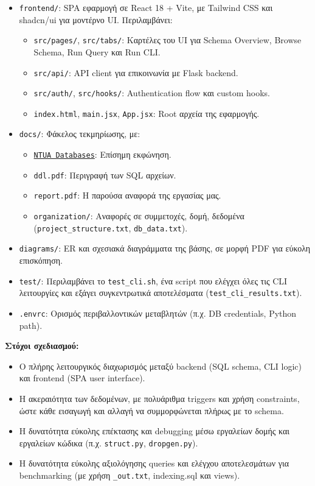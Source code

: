\documentclass[13pt]{extarticle}
\begin{document}
\begin{itemize}
  \item \texttt{frontend/}: SPA εφαρμογή σε React 18 + Vite, με Tailwind CSS και shadcn/ui για μοντέρνο UI. Περιλαμβάνει:
  \begin{itemize}
    \item \texttt{src/pages/}, \texttt{src/tabs/}: Καρτέλες του UI για Schema Overview, Browse Schema, Run Query και Run CLI.
    \item \texttt{src/api/}: API client για επικοινωνία με Flask backend.
    \item \texttt{src/auth/}, \texttt{src/hooks/}: Authentication flow και custom hooks.
    \item \texttt{index.html}, \texttt{main.jsx}, \texttt{App.jsx}: Root αρχεία της εφαρμογής.
  \end{itemize}

  \item \texttt{docs/}: Φάκελος τεκμηρίωσης, με:
  \begin{itemize}
    \item \href{https://www.ece.ntua.gr/en/education/undergraduate/courses?courseId=3123}{\texttt{NTUA Databases}}: Επίσημη εκφώνηση.
    \item \texttt{ddl.pdf}: Περιγραφή των SQL αρχείων.
    \item \texttt{report.pdf}: Η παρούσα αναφορά της εργασίας μας.
    \item \texttt{organization/}: Αναφορές σε συμμετοχές, δομή, δεδομένα (\texttt{project\_structure.txt}, \texttt{db\_data.txt}).
  \end{itemize}

  \item \texttt{diagrams/}: ER και σχεσιακά διαγράμματα της βάσης, σε μορφή PDF για εύκολη επισκόπηση.

  \item \texttt{test/}: Περιλαμβάνει το \texttt{test\_cli.sh}, ένα script που ελέγχει όλες τις CLI λειτουργίες και εξάγει συγκεντρωτικά αποτελέσματα (\texttt{test\_cli\_results.txt}).

  \item \texttt{.envrc}: Ορισμός περιβαλλοντικών μεταβλητών (π.χ. DB credentials, Python path).
\end{itemize}

\vspace{1em}
\noindent\textbf{Στόχοι σχεδιασμού:}
\begin{itemize}
  \item Ο πλήρης λειτουργικός διαχωρισμός μεταξύ backend (SQL schema, CLI logic) και frontend (SPA user interface).
  \item Η ακεραιότητα των δεδομένων, με πολυάριθμα triggers και χρήση constraints, ώστε κάθε εισαγωγή και αλλαγή να συμμορφώνεται πλήρως με το schema.
  \item Η δυνατότητα εύκολης επέκτασης και debugging μέσω εργαλείων δομής και εργαλείων κώδικα (π.χ. \texttt{struct.py}, \texttt{dropgen.py}).
  \item Η δυνατότητα εύκολης αξιολόγησης queries και ελέγχου αποτελεσμάτων για benchmarking (με χρήση \texttt{\_out.txt}, indexing.sql και views).
\end{itemize}
\end{document}
